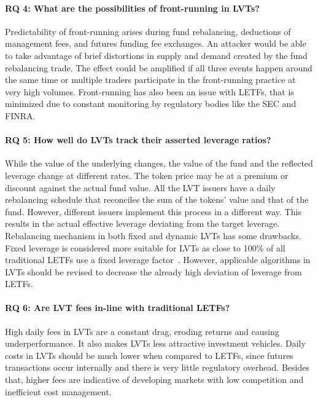 \paragraph{RQ 4: What are the possibilities of front-running in LVTs?} Predictability of front-running arises during fund rebalancing, deductions of management fees, and futures funding fee exchanges. An attacker would be able to take advantage of brief distortions in supply and demand created by the fund rebalancing trade. The effect could be amplified if all three events happen around the same time or multiple traders participate in the front-running practice at very high volumes. Front-running has also been an issue with LETFs, that is minimized due to constant monitoring by regulatory bodies like the SEC and FINRA.
	
\paragraph{RQ 5: How well do LVTs track their asserted leverage ratios?} While the value of the underlying changes, the value of the fund and the reflected leverage change at different rates. The token price may be at a premium or discount against the actual fund value. All the LVT issuers have a daily rebalancing schedule that reconciles the sum of the tokens' value and that of the fund. However, different issuers implement this process in a different way. This results in the actual effective leverage deviating from the target leverage. Rebalancing mechanism in both fixed and dynamic LVTs has some drawbacks. Fixed leverage is considered more suitable for LVTs as close to 100\% of all traditional LETFs use a fixed leverage factor~\cite{ETFDB}. However, applicable algorithms in LVTs should be revised to decrease the already high deviation of leverage from LETFs.
	
\paragraph{RQ 6: Are LVT fees in-line with traditional LETFs?} High daily fees in LVTs are a constant drag, eroding returns and causing underperformance. It also makes LVTs less attractive investment vehicles. Daily costs in LVTs should be much lower when compared to LETFs, since futures transactions occur internally and there is very little regulatory overhead. Besides that, higher fees are indicative of developing markets with low competition and inefficient cost management.

